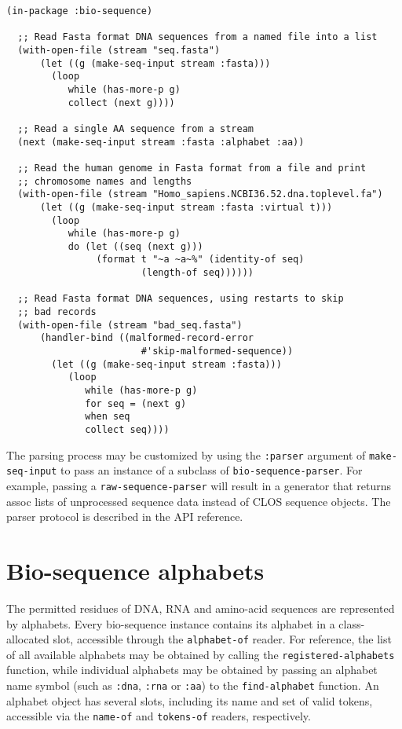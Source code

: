 \documentclass[a4paper, 12pt]{article}
\begin{document}
\begin{lstlisting}[caption={Making sequences from streams},
  label=read-bioseq-stream]
  (in-package :bio-sequence)
  
  ;; Read Fasta format DNA sequences from a named file into a list
  (with-open-file (stream "seq.fasta")
      (let ((g (make-seq-input stream :fasta)))
        (loop
           while (has-more-p g)
           collect (next g))))

  ;; Read a single AA sequence from a stream
  (next (make-seq-input stream :fasta :alphabet :aa))

  ;; Read the human genome in Fasta format from a file and print
  ;; chromosome names and lengths
  (with-open-file (stream "Homo_sapiens.NCBI36.52.dna.toplevel.fa")
      (let ((g (make-seq-input stream :fasta :virtual t)))
        (loop
           while (has-more-p g)
           do (let ((seq (next g)))
                (format t "~a ~a~%" (identity-of seq)
                        (length-of seq))))))

  ;; Read Fasta format DNA sequences, using restarts to skip
  ;; bad records
  (with-open-file (stream "bad_seq.fasta")
      (handler-bind ((malformed-record-error
                        #'skip-malformed-sequence))
        (let ((g (make-seq-input stream :fasta)))
           (loop
              while (has-more-p g)
              for seq = (next g)
              when seq
              collect seq))))
\end{lstlisting}

The parsing process may be customized by using the \lstinline!:parser!
argument of \lstinline!make-seq-input! to pass an instance of a
subclass of \lstinline!bio-sequence-parser!. For example, passing a
\lstinline!raw-sequence-parser!  will result in a generator that
returns assoc lists of unprocessed sequence data instead of CLOS
sequence objects. The parser protocol is described in the API
reference.


\section{Bio-sequence alphabets}
\label{sec:alphabet-bioseq}

The permitted residues of DNA, RNA and amino-acid sequences are
represented by alphabets. Every bio-sequence instance contains its
alphabet in a class-allocated slot, accessible through the
\lstinline!alphabet-of! reader. For reference, the list of all
available alphabets may be obtained by calling the
\lstinline!registered-alphabets! function, while individual alphabets
may be obtained by passing an alphabet name symbol (such as
\lstinline!:dna!, \lstinline!:rna! or \lstinline!:aa!) to the
\lstinline!find-alphabet! function. An alphabet object has several
slots, including its name and set of valid tokens, accessible via the
\lstinline!name-of! and \lstinline!tokens-of! readers, respectively.
\end{document}
